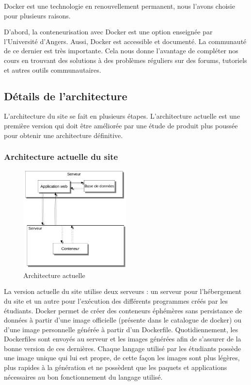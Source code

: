 \par Docker est une technologie en renouvellement permanent, nous l'avons choisie pour plusieurs raisons. \\

\par D'abord, la conteneurisation avec Docker est une option enseignée par l'Université d'Angers. Aussi, Docker est accessible et documenté. La communauté de ce dernier est très importante. Cela nous donne l’avantage de compléter nos cours en trouvant des solutions à des problèmes réguliers sur des forums, tutoriels et autres outils communautaires.


\subsection{Détails de l'architecture}

\par L’architecture du site se fait en plusieurs étapes. L'architecture actuelle est une première version qui doit être améliorée par une étude de produit plus poussée pour obtenir une architecture définitive.

\subsubsection{Architecture actuelle du site}

\begin{figure}[H]
\centering
\includegraphics[width=0.5\textwidth]{./img/backend/architectureactuelle.png}
\caption{Architecture actuelle}
\end{figure}

\par La version actuelle du site utilise deux serveurs : un serveur pour l’hébergement du site et un autre pour l’exécution des différents programmes créés par les étudiants. Docker permet de créer des conteneurs éphémères sans persistance de données à partir d’une image officielle (présente dans le catalogue de docker) ou d’une image personnelle générée à partir d’un Dockerfile. Quotidiennement, les Dockerfiles sont envoyés au serveur et les images générées afin de s’assurer de la bonne version de ces dernières. Chaque langage utilisé par les étudiants possède une image unique qui lui est propre, de cette façon les images sont plus légères, plus rapides à la génération et ne possèdent que les paquets et applications nécessaires au bon fonctionnement du langage utilisé. 

